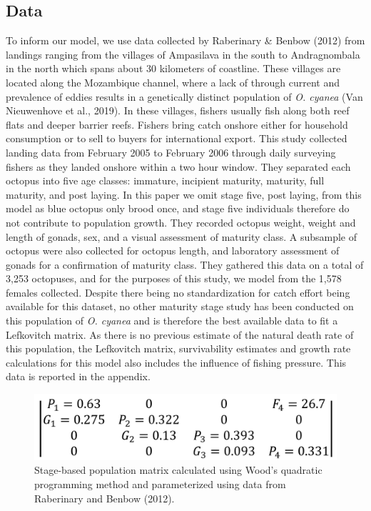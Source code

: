 \documentclass[
]{article}
\begin{document}
\hypertarget{data}{%
\subsection{Data}\label{data}}

To inform our model, we use data collected by Raberinary \& Benbow (2012) from landings ranging from the villages of Ampasilava in the south to Andragnombala in the north which spans about 30 kilometers of coastline. These villages are located along the Mozambique channel, where a lack of through current and prevalence of eddies results in a genetically distinct population of \emph{O. cyanea} (Van Nieuwenhove et al., 2019). In these villages, fishers usually fish along both reef flats and deeper barrier reefs. Fishers bring catch onshore either for household consumption or to sell to buyers for international export. This study collected landing data from February 2005 to February 2006 through daily surveying fishers as they landed onshore within a two hour window. They separated each octopus into five age classes: immature, incipient maturity, maturity, full maturity, and post laying. In this paper we omit stage five, post laying, from this model as blue octopus only brood once, and stage five individuals therefore do not contribute to population growth. They recorded octopus weight, weight and length of gonads, sex, and a visual assessment of maturity class. A subsample of octopus were also collected for octopus length, and laboratory assessment of gonads for a confirmation of maturity class. They gathered this data on a total of 3,253 octopuses, and for the purposes of this study, we model from the 1,578 females collected. Despite there being no standardization for catch effort being available for this dataset, no other maturity stage study has been conducted on this population of \emph{O. cyanea} and is therefore the best available data to fit a Lefkovitch matrix. As there is no previous estimate of the natural death rate of this population, the Lefkovitch matrix, survivability estimates and growth rate calculations for this model also includes the influence of fishing pressure. This data is reported in the appendix.

\begin{figure}
\includegraphics[width=1\linewidth]{MtxFilled} \caption{Stage-based population matrix calculated using Wood's quadratic programming method and parameterized using data from Raberinary and Benbow (2012). \label{WriteMtxRounded}}\label{fig:WriteMtxRounded}
\end{figure}
\end{document}
